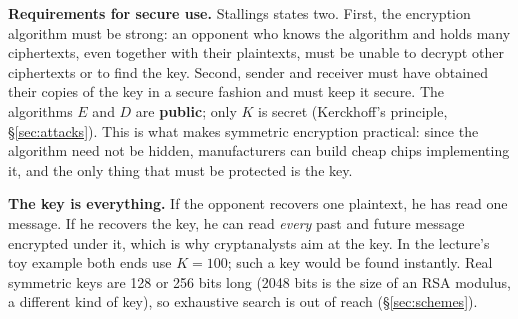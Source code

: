 \textbf{Requirements for secure use.} Stallings states two. First, the encryption algorithm must be strong: an opponent who knows the algorithm and holds many ciphertexts, even together with their plaintexts, must be unable to decrypt other ciphertexts or to find the key. Second, sender and receiver must have obtained their copies of the key in a secure fashion and must keep it secure. The algorithms $E$ and $D$ are \textbf{public}; only $K$ is secret (Kerckhoff's principle, \S\ref{sec:attacks}). This is what makes symmetric encryption practical: since the algorithm need not be hidden, manufacturers can build cheap chips implementing it, and the only thing that must be protected is the key.

\textbf{The key is everything.} If the opponent recovers one plaintext, he has read one message. If he recovers the key, he can read \emph{every} past and future message encrypted under it, which is why cryptanalysts aim at the key. In the lecture's toy example both ends use $K = 100$; such a key would be found instantly. Real symmetric keys are 128 or 256 bits long (2048 bits is the size of an RSA modulus, a different kind of key), so exhaustive search is out of reach (\S\ref{sec:schemes}).

